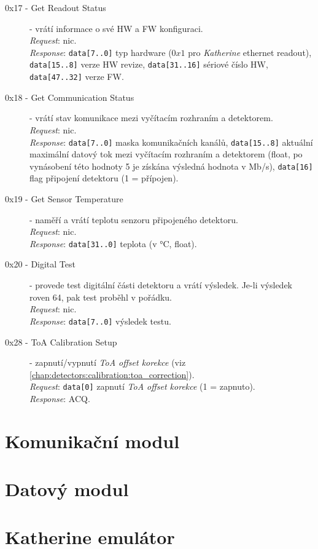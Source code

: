 \begin{description}
    
    \item[0x17 - Get Readout Status] - vrátí informace o své HW a FW konfiguraci.
    \\\textit{Request}: nic.
    \\\textit{Response}: \texttt{data[7..0]} typ hardware ($0x1$ pro \textit{Katherine} ethernet readout),\\\texttt{data[15..8]} verze HW revize, \texttt{data[31..16]} sériové číslo HW, \texttt{data[47..32]} verze FW.

    \item[0x18 - Get Communication Status] - vrátí stav komunikace mezi vyčítacím rozhraním a detektorem.
    \\\textit{Request}: nic.
    \\\textit{Response}: \texttt{data[7..0]} maska komunikačních kanálů, \texttt{data[15..8]} aktuální maximální datový tok mezi vyčítacím rozhraním a detektorem (float, po vynásobení této hodnoty 5 je získána výsledná hodnota v Mb/s), \texttt{data[16]} flag připojení detektoru (1 = přípojen).

    \item[0x19 - Get Sensor Temperature] - naměří a vrátí teplotu senzoru připojeného detektoru.
    \\\textit{Request}: nic.
    \\\textit{Response}: \texttt{data[31..0]} teplota (v °C, float).

    \item[0x20 - Digital Test] - provede test digitální části detektoru a vrátí výsledek. Je-li výsledek roven 64, pak test proběhl v pořádku.
    \\\textit{Request}: nic.
    \\\textit{Response}: \texttt{data[7..0]} výsledek testu.

    \item[0x28 - ToA Calibration Setup] - zapnutí/vypnutí \textit{ToA offset korekce} (viz \ref{chap:detectors:calibration:toa_correction}).
    \\\textit{Request}: \texttt{data[0]} zapnutí \textit{ToA offset korekce} (1 = zapnuto).
    \\\textit{Response}: ACQ.

\end{description}

\section{Komunikační modul}\label{chap:katherine:comm}

\section{Datový modul}\label{chap:katherine:data}

\section{Katherine emulátor}\label{chap:katherine:emulator}